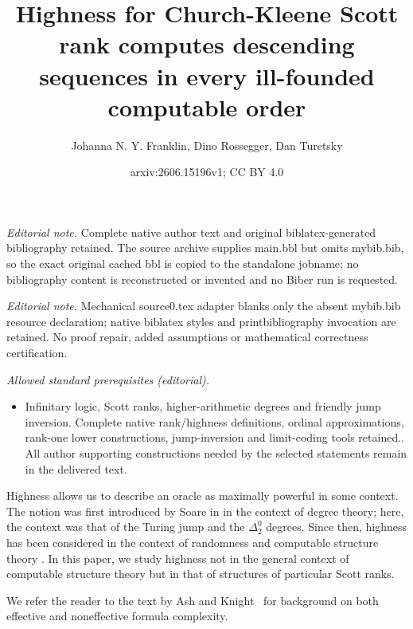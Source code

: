 \documentclass[10pt,a4paper]{amsart}
\title{Highness for Church-Kleene Scott rank computes descending sequences in every ill-founded computable order}
\author{Johanna N. Y. Franklin, Dino Rossegger, Dan Turetsky}
\date{arxiv:2606.15196v1; CC BY 4.0}
\newcommand\+[1]{\mathcal{#1}}
\renewcommand\*[1]{\mathbf{#1}}
\renewcommand\=[1]{\text{#1}}
\renewcommand\*[1]{\mathbf{#1}}
\begin{document}
\maketitle
\noindent\textit{Editorial note.} Complete native author text and original biblatex-generated bibliography retained. The source archive supplies main.bbl but omits mybib.bib, so the exact original cached bbl is copied to the standalone jobname; no bibliography content is reconstructed or invented and no Biber run is requested.\par\medskip
\noindent\textit{Editorial note.} Mechanical source0.tex adapter blanks only the absent mybib.bib resource declaration; native biblatex styles and printbibliography invocation are retained. No proof repair, added assumptions or mathematical correctness certification.\par\medskip
\noindent\textit{Allowed standard prerequisites (editorial).}\begin{itemize}
\item Infinitary logic, Scott ranks, higher-arithmetic degrees and friendly jump inversion. Complete native rank/highness definitions, ordinal approximations, rank-one lower constructions, jump-inversion and limit-coding tools retained.. All author supporting constructions needed by the selected statements remain in the delivered text.
\end{itemize}\medskip
Highness allows us to describe an oracle as maximally powerful in some context. The notion was first introduced by Soare in \cite{s72} in the context of degree theory; here, the context was that of the Turing jump and the $\Delta^0_2$ degrees. Since then, highness has been considered in the context of randomness \cite{fsy-bases} and computable structure theory \cite{cft23,cft}. In this paper, we study highness not in the general context of computable structure theory but in that of structures of particular Scott ranks.

We refer the reader to the text by Ash and Knight~\cite{ash2000} for background on both effective and noneffective formula complexity.
\end{document}
